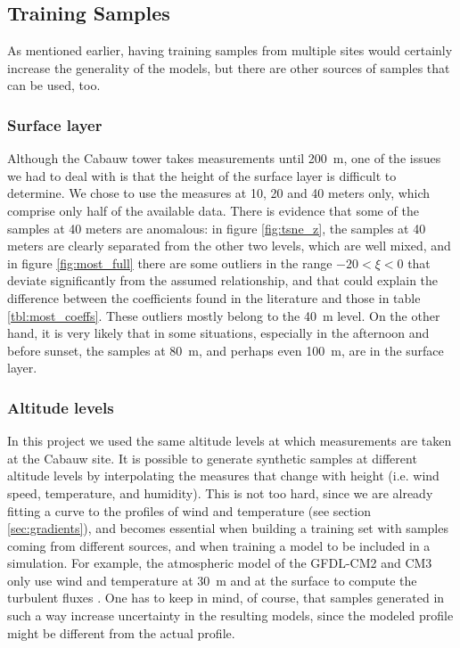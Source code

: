 \documentclass[a4paper,11pt]{kth-mag}
\begin{document}
\subsection{Training Samples}
As mentioned earlier, having training samples from multiple sites would certainly increase the generality of the models, but there are other sources of samples that can be used, too.

\subsubsection{Surface layer} Although the Cabauw tower takes measurements until \SI{200}{\meter}, one of the issues we had to deal with is that the height of the surface layer is difficult to determine. We chose to use the measures at 10, 20 and 40 meters only, which comprise only half of the available data. There is evidence that some of the samples at 40 meters are anomalous: in figure \ref{fig:tsne_z}, the samples at 40 meters are clearly separated from the other two levels, which are well mixed, and in figure \ref{fig:most_full} there are some outliers in the range $-20<\xi<0$ that deviate significantly from the assumed relationship, and that could explain the difference between the coefficients found in the literature and those in table \ref{tbl:most_coeffs}. These outliers mostly belong to the \SI{40}{\meter} level. On the other hand, it is very likely that in some situations, especially in the afternoon and before sunset, the samples at \SI{80}{\meter}, and perhaps even \SI{100}{\meter}, are in the surface layer.

\subsubsection{Altitude levels} In this project we used the same altitude levels at which measurements are taken at the Cabauw site. It is possible to generate synthetic samples at different altitude levels by interpolating the measures that change with height (i.e. wind speed, temperature, and humidity). This is not too hard, since we are already fitting a curve to the profiles of wind and temperature (see section \ref{sec:gradients}), and becomes essential when building a training set with samples coming from different sources, and when training a model to be included in a simulation. For example, the atmospheric model of the GFDL-CM2 and CM3 only use wind and temperature at \SI{30}{\meter} and at the surface to compute the turbulent fluxes \citep{gfdl_am2}. One has to keep in mind, of course, that samples generated in such a way increase uncertainty in the resulting models, since the modeled profile might be different from the actual profile.
\end{document}
